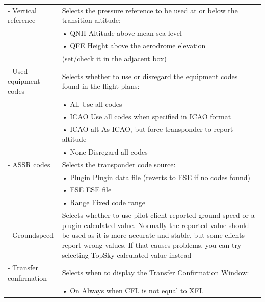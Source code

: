 \documentclass[11pt,a4paper]{memoir}
\begin{document}
\begin{tabular}{p{5cm} p{9cm}}
- Vertical reference      & Selects the pressure reference to be used at or below the transition altitude:\\
                          & \hspace{10pt}• QNH Altitude above mean sea level\\
                          & \hspace{10pt}• QFE Height above the aerodrome elevation\\
                          & (set/check it in the adjacent box)\\
- Used equipment codes    & Selects whether to use or disregard the equipment codes found in the flight plans:\\
                          & \hspace{10pt}• All Use all codes\\
                          & \hspace{10pt}• ICAO Use all codes when specified in ICAO format\\
                          & \hspace{10pt}• ICAO-alt As ICAO, but force transponder to report altitude\\
                          & \hspace{10pt}• None Disregard all codes\\
- ASSR codes              & Selects the transponder code source:\\
                          & \hspace{10pt}• Plugin Plugin data file (reverts to ESE if no codes found)\\
                          & \hspace{10pt}• ESE ESE file\\
                          & \hspace{10pt}• Range Fixed code range\\
- Groundspeed             & Selects whether to use pilot client reported ground speed or a plugin calculated value. Normally the reported value should be used as it is more accurate and stable, but some clients report wrong values. If that causes problems, you can try selecting TopSky calculated value instead\\ 
- Transfer confirmation   & Selects when to display the Transfer Confirmation Window:\\
                          & \hspace{10pt}• On Always when CFL is not equal to XFL\\

\end{tabular}
\end{document}
